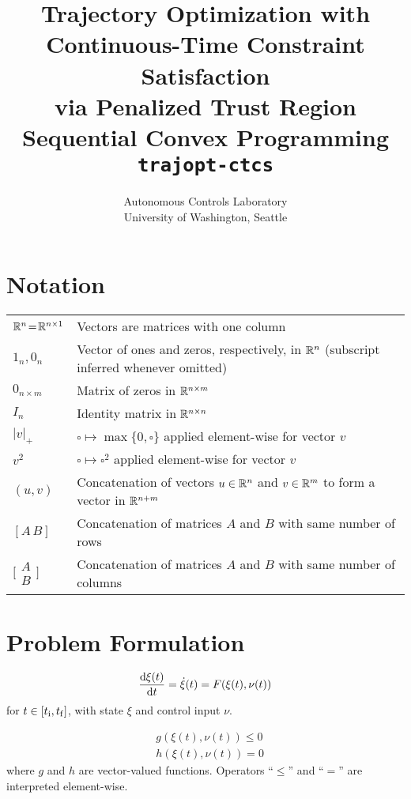 \documentclass[11pt,a4paper]{article}
\title{{\Large Trajectory Optimization with Continuous-Time Constraint Satisfaction\\via Penalized Trust Region Sequential Convex Programming}\\[0.5cm]{\Large\texttt{trajopt-ctcs}}}
\author{{\normalsize Autonomous Controls Laboratory}\\{\normalsize University of Washington, Seattle}}
\date{}
\begin{document}
\maketitle

\tableofcontents

\section{Notation}

\begin{tabular}{ll}
$\mathbb{R}^{n}\!=\!\mathbb{R}^{n\times 1}$ & Vectors are matrices with one column\\
$1_n,0_n$   & Vector of ones and zeros, respectively, in $\mathbb{R}^{n}$ (subscript inferred whenever omitted)\\
$0_{n\times m}$ & Matrix of zeros in $\mathbb{R}^{n\times m}$\\
$I_n$   & Identity matrix in $\mathbb{R}^{n\times n}$\\
$|v|_+$ & $\square \mapsto \max\{0,\square\}$ applied element-wise for vector $v$\\
$v^2$   & $\square \mapsto \square^2$ applied element-wise for vector $v$\\
$(u,v)$ & Concatenation of vectors $u\in\mathbb{R}^{n}$ and $v\in\mathbb{R}^{m}$ to form a vector in $\mathbb{R}^{n+m}$\\
$[A\,B]$ & Concatenation of matrices $A$ and $B$ with same number of rows\\
$\bigg[\!\!\!\begin{array}{c}A\\[-0.1cm]B\end{array}\!\!\bigg]$ & Concatenation of matrices $A$ and $B$ with same number of columns\\
\end{tabular}

\section{Problem Formulation}

\begin{align}
    \frac{\mathrm{d}\xi(t)}{\mathrm{d}t} = \dot{\xi}(t) = F(\xi(t),\nu(t))\label{sys-dyn}
\end{align}
for $t\in[t_{\mathrm{i}},t_{\mathrm{f}}]$, with state $\xi$ and control input $\nu$.

\begin{align*}
    & g(\xi(t),\nu(t)) \le 0\\
    & h(\xi(t),\nu(t)) = 0
\end{align*}
where $g$ and $h$ are vector-valued functions. Operators ``$\le$'' and ``$=$'' are interpreted element-wise.
\end{document}
